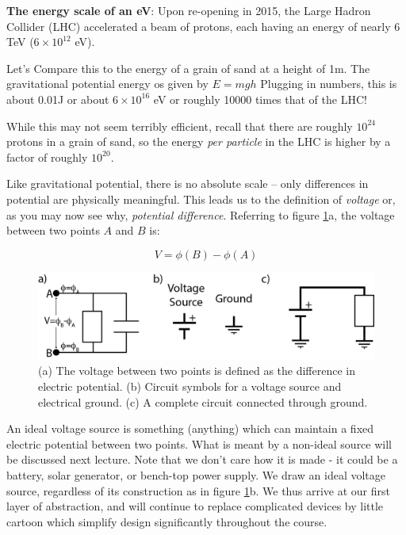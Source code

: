 \documentclass{tufte-book}
\begin{document}
\textbf{The energy scale of an eV}: Upon re-opening in 2015, the Large Hadron Collider (LHC) accelerated a beam of protons, each having an energy of nearly 6 TeV ($6\times10^{12}$ eV).

\noindent Let's Compare this to the energy of a grain of sand at a height of 1m. The gravitational potential energy os given by $E = mgh$ Plugging in numbers, this is about 0.01J or about $6\times10^{16}$ eV  or roughly 10000 times that of the LHC!

While this may not seem terribly efficient, recall that there are roughly $10^{24}$ protons in a grain of sand, so the energy \textit{per particle} in the LHC is higher by a factor of roughly $10^{20}$.

Like gravitational potential, there is no absolute scale -- only differences in potential are physically meaningful. This leads us to the definition of \textit{voltage} or, as you may now see why, \textit{potential difference}. Referring to figure \ref{fig:volt_ref}a, the voltage between two points $A$ and $B$ is:

\begin{equation}
  \boxed{V = \phi(B)-\phi(A)}
\end{equation}

\begin{figure}
\caption{(a) The voltage between two points is defined as the difference in electric potential. (b) Circuit symbols for a voltage source and electrical ground. (c) A complete circuit connected through ground.}
\label{fig:volt_ref}
\begin{center}
\includegraphics[width=\textwidth]{volt_ref}
\end{center}
\end{figure}

An ideal voltage source is something (anything) which can maintain a fixed electric potential between two points. What is meant by a non-ideal source will be discussed next lecture. Note that we don't care how it is made - it could be a battery, solar generator, or bench-top power supply. We draw an ideal voltage source, regardless of its construction as in figure \ref{fig:volt_ref}b. We thus arrive at our first layer of abstraction, and will continue to replace complicated devices by little cartoon which simplify design significantly throughout the course.
\end{document}
